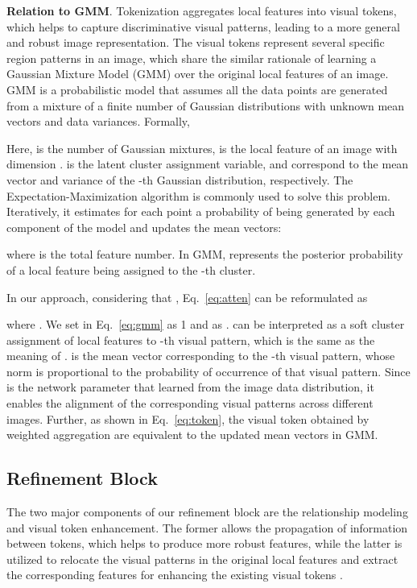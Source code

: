 \documentclass[letterpaper]{article} \usepackage{aaai22}  \usepackage{times}  \usepackage{helvet}  \usepackage{courier}  \usepackage[hyphens]{url}  \usepackage{graphicx} \urlstyle{rm} \def\UrlFont{\rm}  \usepackage{natbib}  \usepackage{caption} \DeclareCaptionStyle{ruled}{labelfont=normalfont,labelsep=colon,strut=off} \frenchspacing  \setlength{\pdfpagewidth}{8.5in}  \setlength{\pdfpageheight}{11in}  \usepackage{algorithm}
\begin{document}
\noindent\textbf{Relation to GMM}.
Tokenization aggregates local features into visual tokens, which helps to capture discriminative visual patterns, leading to a more general and robust image representation. 
The visual tokens represent several specific region patterns in an image, which share the similar rationale of learning a Gaussian Mixture Model (GMM) over the original local features of an image. GMM is a probabilistic model that assumes all the data points are generated from a mixture of a finite number of Gaussian distributions with unknown mean vectors and data variances. Formally,

Here,  is the number of Gaussian mixtures,  is the local feature of an image with dimension .  is the latent
cluster assignment variable,  and  correspond to the mean vector and variance of the -th Gaussian distribution, respectively.
The Expectation-Maximization algorithm is commonly used to solve this problem. Iteratively, it estimates for each point a probability of being generated by each component of the model and updates the mean vectors:

where  is the total feature number. In GMM,  represents the posterior probability of a local feature  being assigned to the -th cluster.

In our approach, considering that , Eq.~\eqref{eq:atten} can be reformulated as

where .
We set  in Eq.~\eqref{eq:gmm} as 1 and  as .  can be interpreted as a soft cluster assignment of local features  to -th visual pattern, which is the same as the meaning of .  is the mean vector corresponding to the -th visual pattern, whose  norm is proportional to the probability of occurrence of that visual pattern. Since  is the network parameter that learned from the image data distribution, it enables the alignment of the corresponding visual patterns across different images.
Further, as shown in Eq.~\eqref{eq:token}, the visual token  obtained by weighted aggregation are equivalent to the updated mean vectors  in GMM.

\subsection{Refinement Block}
The two major components of our refinement block are the relationship modeling and visual token enhancement. The former allows the propagation of information between tokens, which helps to produce more robust features, while the latter is utilized to relocate the visual patterns in the original local features and extract the corresponding features for enhancing the existing visual tokens .
\end{document}
